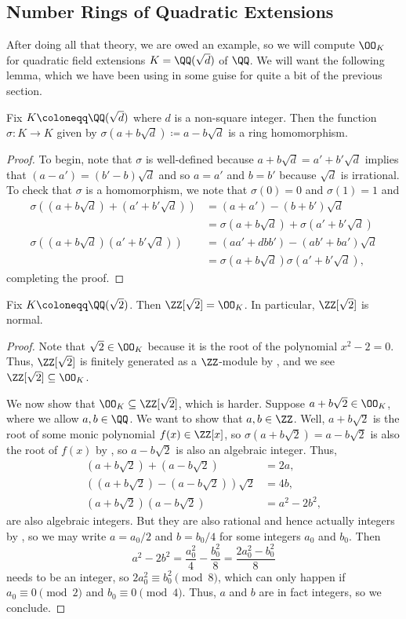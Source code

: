 \documentclass[../notes.tex]{subfiles}
\begin{document}
\subsection{Number Rings of Quadratic Extensions}
After doing all that theory, we are owed an example, so we will compute $\OO_K$ for quadratic field extensions $K=\QQ(\sqrt d)$ of $\QQ$. We will want the following lemma, which we have been using in some guise for quite a bit of the previous section.
\begin{lemma} \label{lem:quadratic-conjugation}
	Fix $K\coloneqq\QQ(\sqrt d)$ where $d$ is a non-square integer. Then the function $\sigma\colon K\to K$ given by $\sigma\left(a+b\sqrt d\right)\coloneqq a-b\sqrt d$ is a ring homomorphism.
\end{lemma}
\begin{proof}
	To begin, note that $\sigma$ is well-defined because $a+b\sqrt d=a'+b'\sqrt d$ implies that $(a-a')=(b'-b)\sqrt d$ and so $a=a'$ and $b=b'$ because $\sqrt d$ is irrational. To check that $\sigma$ is a homomorphism, we note that $\sigma(0)=0$ and $\sigma(1)=1$ and
	\begin{align*}
		\sigma\left((a+b\sqrt d)+(a'+b'\sqrt d)\right) &= (a+a')-(b+b')\sqrt d \\
		&= \sigma(a+b\sqrt d)+\sigma(a'+b'\sqrt d) \\
		\sigma\left((a+b\sqrt d)(a'+b'\sqrt d)\right) &= (aa'+dbb')-(ab'+ba')\sqrt d \\
		&= \sigma\left(a+b\sqrt d\right)\sigma\left(a'+b'\sqrt d\right),
	\end{align*}
	completing the proof.
\end{proof}
\begin{example}
	Fix $K\coloneqq\QQ(\sqrt2)$. Then $\ZZ[\sqrt2]=\OO_K$. In particular, $\ZZ[\sqrt2]$ is normal.
\end{example}
\begin{proof}
	Note that $\sqrt2\in\OO_K$ because it is the root of the polynomial $x^2-2=0$. Thus, $\ZZ[\sqrt2]$ is finitely generated as a $\ZZ$-module by , and we see $\ZZ[\sqrt2]\subseteq\OO_K$.

	We now show that $\OO_K\subseteq\ZZ[\sqrt2]$, which is harder. Suppose $a+b\sqrt 2\in\OO_K$, where we allow $a,b\in\QQ$. We want to show that $a,b\in\ZZ$. Well, $a+b\sqrt2$ is the root of some monic polynomial $f(x)\in\ZZ[x]$, so $\sigma\left(a+b\sqrt2\right)=a-b\sqrt2$ is also the root of $f(x)$ by , so $a-b\sqrt2$ is also an algebraic integer. Thus,
	\begin{align*}
		(a+b\sqrt2)+(a-b\sqrt2)&=2a, \\
		\left((a+b\sqrt2)-(a-b\sqrt2)\right)\sqrt2&=4b, \\
		(a+b\sqrt2)(a-b\sqrt2)&=a^2-2b^2,
	\end{align*}
	are also algebraic integers. But they are also rational and hence actually integers by , so we may write $a=a_0/2$ and $b=b_0/4$ for some integers $a_0$ and $b_0$. Then
	\[a^2-2b^2=\frac{a_0^2}4-\frac{b_0^2}8=\frac{2a_0^2-b_0^2}8\]
	needs to be an integer, so $2a_0^2\equiv b_0^2\pmod8$, which can only happen if $a_0\equiv0\pmod2$ and $b_0\equiv0\pmod4$. Thus, $a$ and $b$ are in fact integers, so we conclude.
\end{proof}
\end{document}
